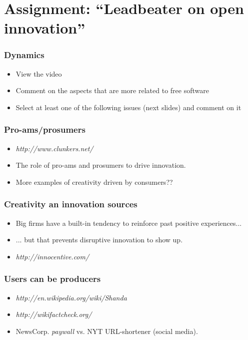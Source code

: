 \section{Assignment: ``Leadbeater on open innovation''}

\begin{frame}
\frametitle{Dynamics}
{\Large
\begin{itemize}
\item View the video
\item Comment on the aspects that are more related to free software
\item Select at least one of the following issues (next slides) and comment on it
\end{itemize}
}
\end{frame}


\begin{frame}
 \frametitle{Pro-ams/prosumers}

{\Large
 \begin{itemize}
  \item \textit{http://www.clunkers.net/}
  \item The role of pro-ams and prosumers to drive innovation.
  \item More examples of creativity driven by consumers??
 \end{itemize}
}

\end{frame}


\begin{frame}
 \frametitle{Creativity an innovation sources}

{\Large
 \begin{itemize}
  \item Big firms have a built-in tendency to reinforce past positive experiences...
  \item ... but that prevents disruptive innovation to show up.
  \item \textit{http://innocentive.com/}
 \end{itemize}
}
\end{frame}


\begin{frame}
 \frametitle{Users can be producers}

{\Large
 \begin{itemize}
  \item \textit{http://en.wikipedia.org/wiki/Shanda}
  \item \textit{http://wikifactcheck.org/}
  \item NewsCorp. \textit{paywall} vs. NYT URL-shortener (social media).
 \end{itemize}
}
\end{frame}
